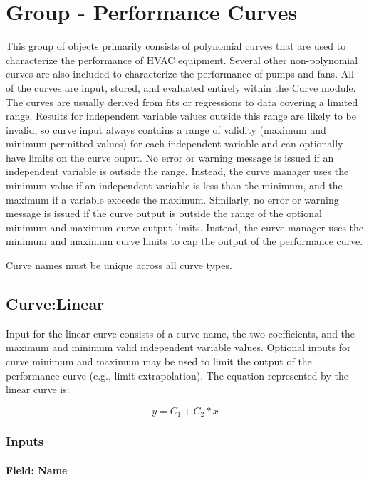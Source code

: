 \section{Group - Performance Curves}\label{group---performance-curves}

This group of objects primarily consists of polynomial curves that are used to characterize the performance of HVAC equipment. Several other non-polynomial curves are also included to characterize the performance of pumps and fans. All of the curves are input, stored, and evaluated entirely within the Curve module. The curves are usually derived from fits or regressions to data covering a limited range. Results for independent variable values outside this range are likely to be invalid, so curve input always contains a range of validity (maximum and minimum permitted values) for each independent variable and can optionally have limits on the curve ouput. No error or warning message is issued if an independent variable is outside the range. Instead, the curve manager uses the minimum value if an independent variable is less than the minimum, and the maximum if a variable exceeds the maximum. Similarly, no error or warning message is issued if the curve output is outside the range of the optional minimum and maximum curve output limits. Instead, the curve manager uses the minimum and maximum curve limits to cap the output of the performance curve.

Curve names must be unique across all curve types.

\subsection{Curve:Linear}\label{curvelinear}

Input for the linear curve consists of a curve name, the two coefficients, and the maximum and minimum valid independent variable values. Optional inputs for curve minimum and maximum may be used to limit the output of the performance curve (e.g., limit extrapolation). The equation represented by the linear curve is:

\begin{equation}
y = {C_1} + {C_2}*x
\end{equation}

\subsubsection{Inputs}\label{inputs-031}

\paragraph{Field: Name}\label{field-name-030}

